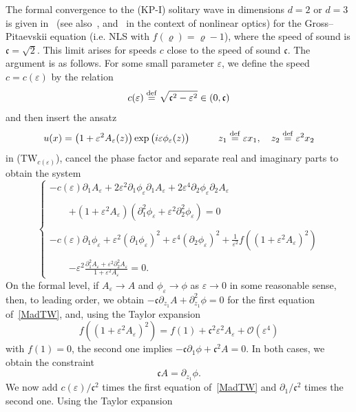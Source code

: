 \documentclass[10pt]{amsart}
\theoremstyle{definition}\newtheorem{defi}[theo]{Definition}\newtheorem{rema}[theo]{Remark}\newtheorem{exam}[theo]{Example}\newtheorem{exem}[theo]{Example}\newtheorem{nota}[theo]{Notation}
\newcommand*\p{\partial}
\newcommand*\ddef{\stackrel{\rm def}{=}}
\newcommand*\BO{\mathcal{O}}
\newcommand*\ds{\displaystyle}
\newcommand*\cs{{\mathfrak c}}
\newcommand*\e{\varepsilon}
\begin{document}
The formal convergence to the (KP-I) solitary wave in dimensions $d= 2$ or $d=3$ is given in~\cite{JR} (see also~\cite{Ior_Smi}, and~\cite{Kiv-Pel} in the context of nonlinear optics) for the Gross--Pitaevskii equation (i.e. NLS with $ f(\varrho)= \varrho - 1 $), where the speed of sound is $ \cs = \sqrt{2} $. This limit arises for speeds $c$ close to the speed of sound $ \cs $. The argument is as follows. For some small parameter $ \e $, we define the speed $ c = c(\e) $ by the relation
\[
c(\e) \ddef \sqrt{\cs^2 - \e^2} \in (0, \cs)
\]
and then insert the ansatz
\begin{equation}\label{ansatzKP}
u(x) = \big(1 + \e^2 A_\e (z) \big)
\exp \big(i\e \phi_\e (z) \big) \qquad \quad z_1 \ddef \e x_1, \quad z_2 \ddef \e^2 x_2
\end{equation}
in (TW$_{c(\e)}$), cancel the phase factor and separate real and imaginary parts to obtain the system
\begin{equation}\label{MadTW}
\left\{
\begin{array}{ll}
\ds{ - c(\e) \p_{1} A_\e + 2 \e^2 \p_{1} \phi_\e \p_{1} A_\e + 2 \e^4 \p_{2} \phi_\e \p_{2} A_\e }
\\ \ \\ \quad \quad \ds{ + \left(1 + \e^2 A_\e\right) \left(\p_{1}^2 \phi_\e +
\e^2 \p^2_{2} \phi_\e \right)} = 0 \\ \ \\
\ds{ - c(\e) \p_{1} \phi_\e + \e^2 (\p_{1} \phi_\e)^2 + \e^4 (\p_{2} \phi_\e)^2 + \frac{1}{\e^2} f\left(\left(1 +\e^2 A_\e\right)^2 \right) }
\\ \ \\ \quad \quad \ds{ - \e^2 \frac{ \p_{1}^2 A_\e + \e^2 \p_{2}^2 A_\e}{1+\e^2 A_\e}} = 0.
\end{array}\right.
\end{equation}
On the formal level, if $A_\e \to A$ and $\phi_\e \to \phi $ as $\e \to 0$ in some reasonable sense, then, to leading order, we obtain $ - \cs \p_{z_1} A +\p^2_{z_1} \phi = 0 $ for the first equation of~\eqref{MadTW}, and, using the Taylor expansion
\[
f\left(\left(1 +\e^2 A_\e\right)^2 \right) = f(1) + \cs^2 \e^2 A_\e + \BO(\e^4)
\]
with $f(1)=0$, the second one implies $ - \cs \p_{1} \phi + \cs^2 A = 0$. In both cases, we obtain the constraint
\begin{equation}\label{prepar}
\cs A = \p_{z_1} \phi.
\end{equation} We now add $c(\e) / \cs^2 $ times the first equation of~\eqref{MadTW} and $\p_{1}/\cs^2 $ times the second one. Using the Taylor expansion
\end{document}
